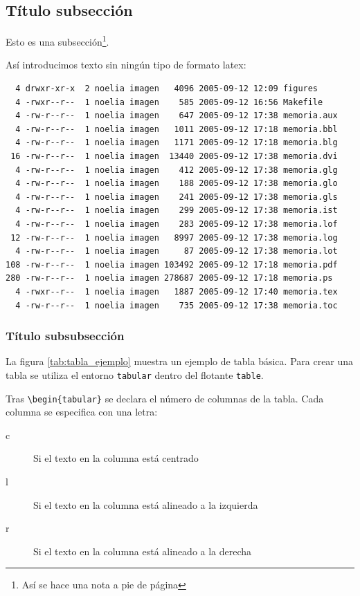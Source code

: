 \subsection{Título subsección}

Esto es una subsección\footnote{Así se hace una nota a pie de página}.


Así introducimos texto sin ningún tipo de formato latex:
\begin{verbatim}
  4 drwxr-xr-x  2 noelia imagen   4096 2005-09-12 12:09 figures
  4 -rwxr--r--  1 noelia imagen    585 2005-09-12 16:56 Makefile
  4 -rw-r--r--  1 noelia imagen    647 2005-09-12 17:38 memoria.aux
  4 -rw-r--r--  1 noelia imagen   1011 2005-09-12 17:18 memoria.bbl
  4 -rw-r--r--  1 noelia imagen   1171 2005-09-12 17:18 memoria.blg
 16 -rw-r--r--  1 noelia imagen  13440 2005-09-12 17:38 memoria.dvi
  4 -rw-r--r--  1 noelia imagen    412 2005-09-12 17:38 memoria.glg
  4 -rw-r--r--  1 noelia imagen    188 2005-09-12 17:38 memoria.glo
  4 -rw-r--r--  1 noelia imagen    241 2005-09-12 17:38 memoria.gls
  4 -rw-r--r--  1 noelia imagen    299 2005-09-12 17:38 memoria.ist
  4 -rw-r--r--  1 noelia imagen    283 2005-09-12 17:38 memoria.lof
 12 -rw-r--r--  1 noelia imagen   8997 2005-09-12 17:38 memoria.log
  4 -rw-r--r--  1 noelia imagen     87 2005-09-12 17:38 memoria.lot
108 -rw-r--r--  1 noelia imagen 103492 2005-09-12 17:18 memoria.pdf
280 -rw-r--r--  1 noelia imagen 278687 2005-09-12 17:18 memoria.ps
  4 -rwxr--r--  1 noelia imagen   1887 2005-09-12 17:40 memoria.tex
  4 -rw-r--r--  1 noelia imagen    735 2005-09-12 17:38 memoria.toc
\end{verbatim}



\subsubsection{Título subsubsección}

La figura \ref{tab:tabla_ejemplo} muestra un ejemplo de tabla básica. Para crear una tabla se utiliza el entorno \texttt{tabular} dentro del flotante \texttt{table}. 


Tras \texttt{\textbackslash begin\{tabular\}} se declara el número de columnas de la tabla. Cada columna se especifica con una letra:
\begin{description}
 \item [c] Si el texto en la columna está centrado
 \item [l] Si el texto en la columna está alineado a la izquierda
 \item [r] Si el texto en la columna está alineado a la derecha
\end{description}

